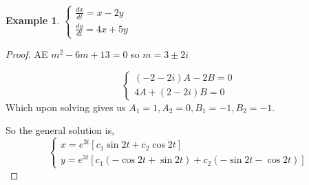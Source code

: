 \documentclass[oneside,11pt,pdftex,final]{book}%
\numberwithin{equation}{section}
\newtheorem{example}[theorem]{Example}
\numberwithin{section}{chapter}
\numberwithin{equation}{chapter}
\begin{document}
\begin{example}
	$ \begin{cases}
		\frac{dx}{dt}=x-2y\\
		\frac{dy}{dt}=4x+5y
	\end{cases} $
\end{example}
\begin{proof}
	AE $ m^2-6m+13=0 $ so $ m=3\pm2i $
	
	\[ \begin{cases}
		(-2-2i)A-2B=0\\
		4A+(2-2i)B=0
	\end{cases} \]
Which upon solving gives us $ A_1=1,A_2=0, B_1=-1,B_2=-1$.

So the general solution is,
\[ \begin{cases}
	x=e^{3t}[c_1 \sin 2t + c_2 \cos 2t]\\
	y=e^{3t}[c_1 (-\cos 2t + \sin 2t)+c_2 (-\sin 2t - \cos 2t)]
\end{cases} \]
\end{proof}
\end{document}
